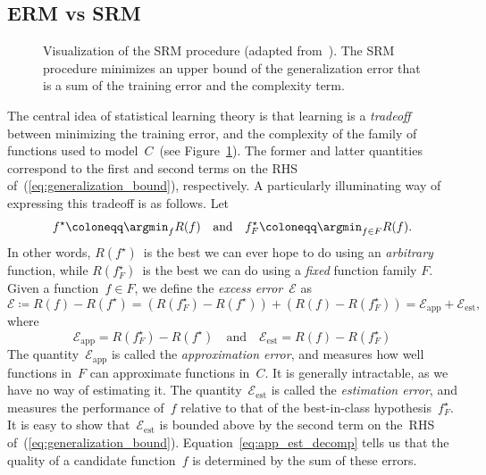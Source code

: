 \documentclass[11pt,a4paper]{article}
\numberwithin{equation}{section}
\newcommand{\apperr}{\mathcal{E}_{\mathrm{app}}}
\newcommand{\esterr}{\mathcal{E}_{\mathrm{est}}}
\begin{document}
\subsection{ERM vs SRM}
\label{sec:erm_vs_srm}

\begin{figure}
\centering
{}
\caption{Visualization of the SRM procedure (adapted from~\citet{ml_mohri}). The
SRM procedure minimizes an upper bound of the generalization error that is a sum
of the training error and the complexity term.\label{fig:srm_graph}}
\end{figure}

The central idea of statistical learning theory is that learning is a
\emph{tradeoff} between minimizing the training error, and the complexity of the
family of functions used to model~$C$~(see Figure~\ref{fig:srm_graph}). The
former and latter quantities correspond to the first and second terms on the RHS
of~(\ref{eq:generalization_bound}), respectively. A particularly illuminating
way of expressing this tradeoff is as follows. Let
\[
	f^\star \coloneqq \argmin_{f} R(f) \quad\text{and}\quad
	f_F^\star \coloneqq \argmin_{f \in F} R(f).
\]
In other words, $R(f^\star)$~is the best we can ever hope to do using an
\emph{arbitrary} function, while $R(f_F^\star)$~is the best we can do using a
\emph{fixed} function family $F$. Given a function~$f \in F$, we define the
\emph{excess error}~$\mathcal{E}$ as
\begin{equation}
	\mathcal{E} \coloneqq R(f) - R(f^\star)
		= (R(f_F^\star) - R(f^\star)) + (R(f) - R(f_F^\star))
		= \apperr + \esterr,
	\label{eq:app_est_decomp}
\end{equation}
where
\[
	\apperr = R(f_F^\star) - R(f^\star)
	\quad\text{and}\quad
	\esterr = R(f) - R(f_F^\star)
\]
The quantity~$\apperr$ is called the \emph{approximation error}, and measures
how well functions in~$F$ can approximate functions in~$C$. It is generally
intractable, as we have no way of estimating it. The quantity~$\esterr$ is
called the \emph{estimation error}, and measures the performance of~$f$ relative
to that of the best-in-class hypothesis~$f_F^\star$. It is easy to show
that~$\esterr$ is bounded above by the second term on the~RHS
of~(\ref{eq:generalization_bound}). Equation~\ref{eq:app_est_decomp} tells us
that the quality of a candidate function~$f$ is determined by the sum of these
errors.
\end{document}
